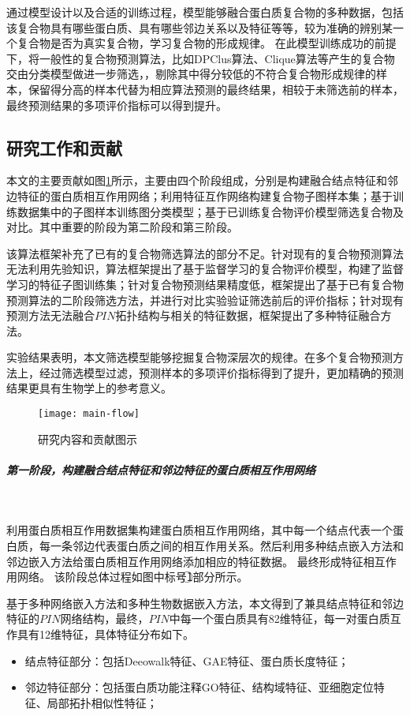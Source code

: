 通过模型设计以及合适的训练过程，模型能够融合蛋白质复合物的多种数据，包括该复合物具有哪些蛋白质、具有哪些邻边关系以及特征等等，较为准确的辨别某一个复合物是否为真实复合物，学习复合物的形成规律。
在此模型训练成功的前提下，将一般性的复合物预测算法，比如DPClus算法\cite{altaf-ul-amin_development_2006}、Clique算法\cite{spirin_protein_2003}等产生的复合物交由分类模型做进一步筛选，，剔除其中得分较低的不符合复合物形成规律的样本，保留得分高的样本代替为相应算法预测的最终结果，相较于未筛选前的样本，最终预测结果的多项评价指标可以得到提升。

\subsection{研究工作和贡献}
\label{subsection:motivationAndThinking:flow}

本文的主要贡献如图\ref{fig:main-flow}所示，主要由四个阶段组成，分别是构建融合结点特征和邻边特征的蛋白质相互作用网络；利用特征互作网络构建复合物子图样本集；基于训练数据集中的子图样本训练图分类模型；基于已训练复合物评价模型筛选复合物及对比。其中重要的阶段为第二阶段和第三阶段。

该算法框架补充了已有的复合物筛选算法的部分不足。针对现有的复合物预测算法无法利用先验知识，算法框架提出了基于监督学习的复合物评价模型，构建了监督学习的特征子图训练集；针对复合物预测结果精度低，框架提出了基于已有复合物预测算法的二阶段筛选方法，并进行对比实验验证筛选前后的评价指标；针对现有预测方法无法融合$PIN$拓扑结构与相关的特征数据，框架提出了多种特征融合方法。

实验结果表明，本文筛选模型能够挖掘复合物深层次的规律。在多个复合物预测方法上，经过筛选模型过滤，预测样本的多项评价指标得到了提升，更加精确的预测结果更具有生物学上的参考意义。

\begin{figure}[htbp]
  \centering
  \texttt{[image: main-flow]}
  \caption{研究内容和贡献图示}
  \label{fig:main-flow}
\end{figure}

\subparagraph*{第一阶段，构建融合结点特征和邻边特征的蛋白质相互作用网络} ~

利用蛋白质相互作用数据集构建蛋白质相互作用网络，其中每一个结点代表一个蛋白质，每一条邻边代表蛋白质之间的相互作用关系。然后利用多种结点嵌入方法和邻边嵌入方法给蛋白质相互作用网络添加相应的特征数据。
最终形成特征相互作用网络。
该阶段总体过程如图中标号\textcircled{1}部分所示。

基于多种网络嵌入方法和多种生物数据嵌入方法，本文得到了兼具结点特征和邻边特征的$PIN$网络结构，最终，$PIN$中每一个蛋白质具有82维特征，每一对蛋白质互作具有12维特征，具体特征分布如下。
\begin{itemize}
  \item 结点特征部分：包括Deeowalk特征、GAE特征、蛋白质长度特征；
  \item 邻边特征部分：包括蛋白质功能注释GO特征、结构域特征、亚细胞定位特征、局部拓扑相似性特征；
\end{itemize}

